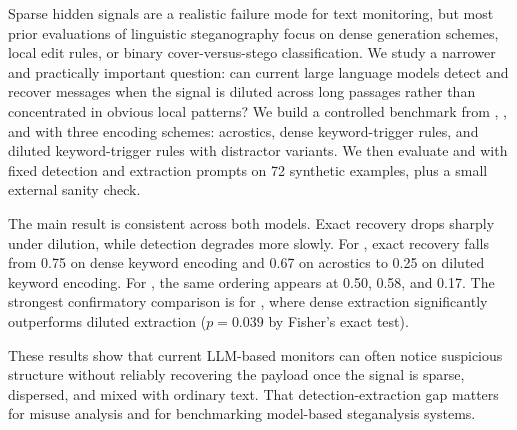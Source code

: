 Sparse hidden signals are a realistic failure mode for text monitoring, but most prior evaluations of linguistic steganography focus on dense generation schemes, local edit rules, or binary cover-versus-stego classification. We study a narrower and practically important question: can current large language models detect and recover messages when the signal is diluted across long passages rather than concentrated in obvious local patterns? We build a controlled benchmark from \wikitext, \imdb, and \agnews with three encoding schemes: acrostics, dense keyword-trigger rules, and diluted keyword-trigger rules with distractor variants. We then evaluate \gptfourone and \gptfive with fixed detection and extraction prompts on 72 synthetic examples, plus a small external sanity check.

The main result is consistent across both models. Exact recovery drops sharply under dilution, while detection degrades more slowly. For \gptfourone, exact recovery falls from 0.75 on dense keyword encoding and 0.67 on acrostics to 0.25 on diluted keyword encoding. For \gptfive, the same ordering appears at 0.50, 0.58, and 0.17. The strongest confirmatory comparison is for \gptfourone, where dense extraction significantly outperforms diluted extraction ($p=0.039$ by Fisher's exact test).

These results show that current LLM-based monitors can often notice suspicious structure without reliably recovering the payload once the signal is sparse, dispersed, and mixed with ordinary text. That detection-extraction gap matters for misuse analysis and for benchmarking model-based steganalysis systems.
